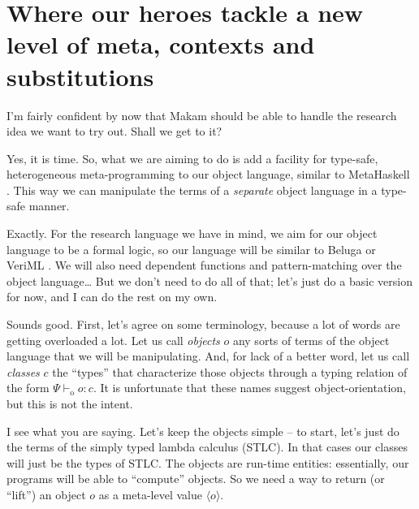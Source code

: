 \section{Where our heroes tackle a new level of meta, contexts and
substitutions}\label{where-our-heroes-tackle-a-new-level-of-meta-contexts-and-substitutions}

\heroSTUDENT{} I'm fairly confident by now that Makam should be able to handle
the research idea we want to try out. Shall we get to it?

\heroADVISOR{} Yes, it is time. So, what we are aiming to do is add a facility
for type-safe, heterogeneous meta-programming to our object language,
similar to MetaHaskell \citep{mainland2012explicitly}. This way we can
manipulate the terms of a \emph{separate} object language in a type-safe
manner.

\heroSTUDENT{} Exactly. For the research language we have in mind, we aim for
our object language to be a formal logic, so our language will be
similar to Beluga \citep{beluga-main-reference} or VeriML
\citep{veriml-main-reference}. We will also need dependent functions and
pattern-matching over the object language\ldots{} But we don't need to
do all of that; let's just do a basic version for now, and I can do the
rest on my own.

\newcommand\dep[1]{\ensuremath{#1}}
\newcommand\lift[1]{\ensuremath{\langle#1\rangle}}
\newcommand\odash[0]{\ensuremath{\vdash_{\text{o}}}}
\newcommand\wf[0]{\ensuremath{\; \text{wf}}}
\newcommand\aq[1]{\ensuremath{\texttt{aq}(#1)}}
\newcommand\aqopen[1]{\ensuremath{\texttt{aqopen}(#1)}}

\heroADVISOR{} Sounds good. First, let's agree on some terminology, because a
lot of words are getting overloaded a lot. Let us call \emph{objects}
\(o\) any sorts of terms of the object language that we will be
manipulating. And, for lack of a better word, let us call \emph{classes}
\(c\) the ``types'' that characterize those objects through a typing
relation of the form \(\Psi \odash o : c\). It is unfortunate that these
names suggest object-orientation, but this is not the intent.

\heroSTUDENT{} I see what you are saying. Let's keep the objects simple -- to
start, let's just do the terms of the simply typed lambda calculus
(STLC). In that cases our classes will just be the types of STLC. The
objects are run-time entities: essentially, our programs will be able to
``compute'' objects. So we need a way to return (or ``lift'') an object
\(o\) as a meta-level value \(\lift{o}\).

